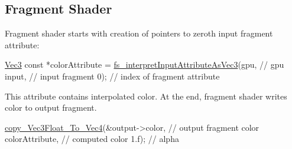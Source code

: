 \hypertarget{triangleExample.c_FragmentShader}{}\subsection{Fragment Shader}\label{triangleExample.c_FragmentShader}
Fragment shader starts with creation of pointers to zeroth input fragment attribute\-: 
\begin{DoxyCodeInclude}
  \hyperlink{structVec3}{Vec3} \textcolor{keyword}{const} *colorAttribute =
      \hyperlink{program_8h_a132afaeef0a64d93305bb2df3f35a524}{fs\_interpretInputAttributeAsVec3}(gpu,    \textcolor{comment}{// gpu}
                                       input,  \textcolor{comment}{// input fragment}
                                       0);     \textcolor{comment}{// index of fragment attribute}
\end{DoxyCodeInclude}
This attribute contains interpolated color. At the end, fragment shader writes color to output fragment. 
\begin{DoxyCodeInclude}
  \hyperlink{linearAlgebra_8c_aa6574ab0f21fd2161a67abef60544177}{copy\_Vec3Float\_To\_Vec4}(&output->color,  \textcolor{comment}{// output fragment color}
                         colorAttribute,  \textcolor{comment}{// computed color}
                         1.f);            \textcolor{comment}{// alpha}
\end{DoxyCodeInclude}
 
\begin{DoxyCodeInclude}
\end{DoxyCodeInclude}
 